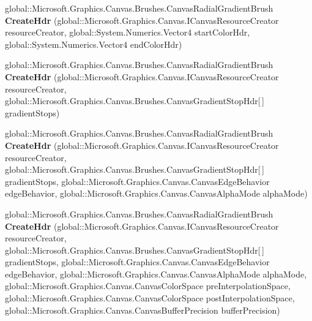 \begin{DoxyCompactItemize}
\item 
\mbox{\label{interface_microsoft_1_1_graphics_1_1_canvas_1_1_brushes_1_1_i_canvas_radial_gradient_brush_statics_a33c22a712d4ae1fd59611737c9f40f6b}} 
global\+::\+Microsoft.\+Graphics.\+Canvas.\+Brushes.\+Canvas\+Radial\+Gradient\+Brush {\bfseries Create\+Hdr} (global\+::\+Microsoft.\+Graphics.\+Canvas.\+I\+Canvas\+Resource\+Creator resource\+Creator, global\+::\+System.\+Numerics.\+Vector4 start\+Color\+Hdr, global\+::\+System.\+Numerics.\+Vector4 end\+Color\+Hdr)
\item 
\mbox{\label{interface_microsoft_1_1_graphics_1_1_canvas_1_1_brushes_1_1_i_canvas_radial_gradient_brush_statics_a875dc22871a8814a201d278d00a3844f}} 
global\+::\+Microsoft.\+Graphics.\+Canvas.\+Brushes.\+Canvas\+Radial\+Gradient\+Brush {\bfseries Create\+Hdr} (global\+::\+Microsoft.\+Graphics.\+Canvas.\+I\+Canvas\+Resource\+Creator resource\+Creator, global\+::\+Microsoft.\+Graphics.\+Canvas.\+Brushes.\+Canvas\+Gradient\+Stop\+Hdr\mbox{[}$\,$\mbox{]} gradient\+Stops)
\item 
\mbox{\label{interface_microsoft_1_1_graphics_1_1_canvas_1_1_brushes_1_1_i_canvas_radial_gradient_brush_statics_aa2aa4c9e128daa190430d9e6057029c7}} 
global\+::\+Microsoft.\+Graphics.\+Canvas.\+Brushes.\+Canvas\+Radial\+Gradient\+Brush {\bfseries Create\+Hdr} (global\+::\+Microsoft.\+Graphics.\+Canvas.\+I\+Canvas\+Resource\+Creator resource\+Creator, global\+::\+Microsoft.\+Graphics.\+Canvas.\+Brushes.\+Canvas\+Gradient\+Stop\+Hdr\mbox{[}$\,$\mbox{]} gradient\+Stops, global\+::\+Microsoft.\+Graphics.\+Canvas.\+Canvas\+Edge\+Behavior edge\+Behavior, global\+::\+Microsoft.\+Graphics.\+Canvas.\+Canvas\+Alpha\+Mode alpha\+Mode)
\item 
\mbox{\label{interface_microsoft_1_1_graphics_1_1_canvas_1_1_brushes_1_1_i_canvas_radial_gradient_brush_statics_a86665bd26bca12d2ecfcc18dc1a6ae1a}} 
global\+::\+Microsoft.\+Graphics.\+Canvas.\+Brushes.\+Canvas\+Radial\+Gradient\+Brush {\bfseries Create\+Hdr} (global\+::\+Microsoft.\+Graphics.\+Canvas.\+I\+Canvas\+Resource\+Creator resource\+Creator, global\+::\+Microsoft.\+Graphics.\+Canvas.\+Brushes.\+Canvas\+Gradient\+Stop\+Hdr\mbox{[}$\,$\mbox{]} gradient\+Stops, global\+::\+Microsoft.\+Graphics.\+Canvas.\+Canvas\+Edge\+Behavior edge\+Behavior, global\+::\+Microsoft.\+Graphics.\+Canvas.\+Canvas\+Alpha\+Mode alpha\+Mode, global\+::\+Microsoft.\+Graphics.\+Canvas.\+Canvas\+Color\+Space pre\+Interpolation\+Space, global\+::\+Microsoft.\+Graphics.\+Canvas.\+Canvas\+Color\+Space post\+Interpolation\+Space, global\+::\+Microsoft.\+Graphics.\+Canvas.\+Canvas\+Buffer\+Precision buffer\+Precision)

\end{DoxyCompactItemize}
